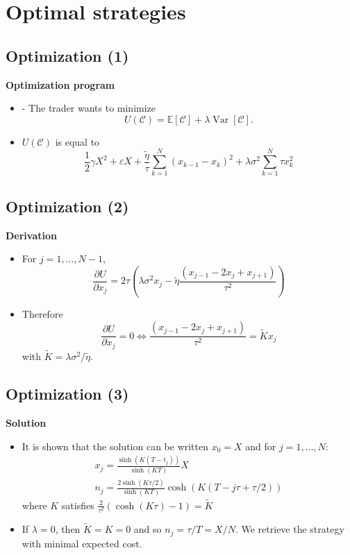 \documentclass[10pt]{article}
\begin{document}
\section{Optimal strategies}

\subsection{Optimization (1)}

\textbf{Optimization program}

\begin{itemize} 
    \item - The trader wants to minimize
    $$
    U(\mathcal{C})=\mathbb{E}[\mathcal{C}]+\lambda \operatorname{Var}[\mathcal{C}] .
    $$
    \item $U(\mathcal{C})$ is equal to
    $$
    \frac{1}{2} \gamma X^{2}+\varepsilon X+\frac{\tilde{\eta}}{\tau} \sum_{k=1}^{N}\left(x_{k-1}-x_{k}\right)^{2}+\lambda \sigma^{2} \sum_{k=1}^{N} \tau x_{k}^{2}
    $$
\end{itemize}

\subsection{Optimization (2)}

\textbf{Derivation}

\begin{itemize} 
    \item For $j=1, \ldots, N-1$,
    $$
    \frac{\partial U}{\partial x_{j}}=2 \tau\left(\lambda \sigma^{2} x_{j}-\tilde{\eta} \frac{\left(x_{j-1}-2 x_{j}+x_{j+1}\right)}{\tau^{2}}\right)
    $$
    \item Therefore
    $$
    \frac{\partial U}{\partial x_{j}}=0 \Leftrightarrow \frac{\left(x_{j-1}-2 x_{j}+x_{j+1}\right)}{\tau^{2}}=\tilde{K} x_{j}
    $$
    with $\tilde{K}=\lambda \sigma^{2} / \tilde{\eta}$.    
\end{itemize}

\subsection{Optimization (3)}

\textbf{Solution}

\begin{itemize} 
    \item It is shown that the solution can be written $x_{0}=X$ and for $j=1, \ldots, N:$
    $$
    \begin{array}{l}
    x_{j}=\frac{\sinh \left(K\left(T-t_{j}\right)\right)}{\sinh (K T)} X \\
    n_{j}=\frac{2 \sinh (K \tau / 2)}{\sinh (K T)} \cosh (K(T-j \tau+\tau / 2))
    \end{array}
    $$
    where $K$ satisfies $\frac{2}{\tau^{2}}(\cosh (K \tau)-1)=\tilde{K}$
    \item If $\lambda=0$, then $\tilde{K}=K=0$ and so $n_{j}=\tau / T=X / N$. We retrieve the strategy with minimal expected cost.
\end{itemize}
\end{document}
